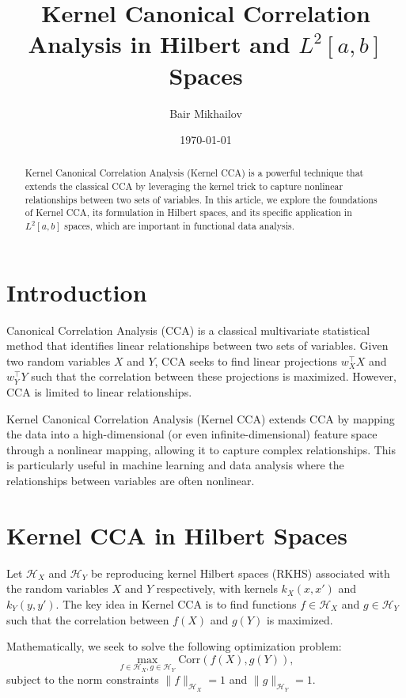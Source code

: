 \documentclass[12pt]{article}
\title{Kernel Canonical Correlation Analysis in Hilbert and \( L^2[a,b] \) Spaces}
\author{Bair Mikhailov}
\date{\today}
\begin{document}
\maketitle

\begin{abstract}
Kernel Canonical Correlation Analysis (Kernel CCA) is a powerful technique that extends the classical CCA by leveraging the kernel trick to capture nonlinear relationships between two sets of variables. In this article, we explore the foundations of Kernel CCA, its formulation in Hilbert spaces, and its specific application in \( L^2[a,b] \) spaces, which are important in functional data analysis.
\end{abstract}

\section{Introduction}

Canonical Correlation Analysis (CCA) is a classical multivariate statistical method that identifies linear relationships between two sets of variables. Given two random variables \( X \) and \( Y \), CCA seeks to find linear projections \( w_X^\top X \) and \( w_Y^\top Y \) such that the correlation between these projections is maximized. However, CCA is limited to linear relationships.

Kernel Canonical Correlation Analysis (Kernel CCA) extends CCA by mapping the data into a high-dimensional (or even infinite-dimensional) feature space through a nonlinear mapping, allowing it to capture complex relationships. This is particularly useful in machine learning and data analysis where the relationships between variables are often nonlinear.

\section{Kernel CCA in Hilbert Spaces}

Let \( \mathcal{H}_X \) and \( \mathcal{H}_Y \) be reproducing kernel Hilbert spaces (RKHS) associated with the random variables \( X \) and \( Y \) respectively, with kernels \( k_X(x, x') \) and \( k_Y(y, y') \). The key idea in Kernel CCA is to find functions \( f \in \mathcal{H}_X \) and \( g \in \mathcal{H}_Y \) such that the correlation between \( f(X) \) and \( g(Y) \) is maximized.

Mathematically, we seek to solve the following optimization problem:
\[
\max_{f \in \mathcal{H}_X, g \in \mathcal{H}_Y} \text{Corr}(f(X), g(Y)),
\]
subject to the norm constraints \( \|f\|_{\mathcal{H}_X} = 1 \) and \( \|g\|_{\mathcal{H}_Y} = 1 \).
\end{document}
